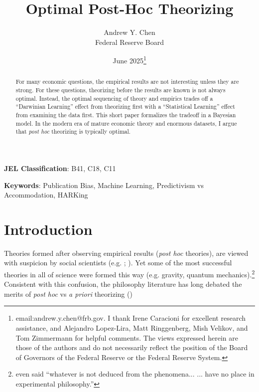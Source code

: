 \documentclass[12pt,english]{article}
\theoremstyle{plain}
\theoremstyle{plain}
\begin{document}
\title{Optimal Post-Hoc Theorizing}

\newif\ifanon
\anontrue
\anonfalse %

\ifanon
    \author{}
    \date{}
\else
    \author{{Andrew Y. Chen}\\
    {\normalsize Federal Reserve Board}}
    \date{June 2025\thanks{email:andrew.y.chen@frb.gov. I thank Irene Caracioni for excellent research assistance, and Alejandro Lopez-Lira, Matt Ringgenberg, Mish Velikov, and Tom Zimmermann for helpful comments. The views expressed herein are those of the authors and do not necessarily reflect the position of the Board of Governors of the Federal Reserve or the Federal Reserve System.}}
\fi

\maketitle

 
\begin{abstract}
\begin{singlespace}
\noindent For many economic questions, the empirical results are not interesting unless they are strong. For these questions, theorizing before the results are known is not always optimal. Instead, the optimal sequencing of theory and empirics trades off a ``Darwinian Learning'' effect from theorizing first with a ``Statistical Learning'' effect from examining the data first. This short paper formalizes the tradeoff in a Bayesian model. In the modern era of mature economic theory and enormous datasets, I argue that \emph{post hoc} theorizing is typically optimal.
\end{singlespace}
\end{abstract}
\vspace{10ex}
\textbf{\color{Black}JEL Classification}: B41, C18, C11

\noindent\textbf{\color{Black}Keywords}: Publication Bias, Machine Learning,  Predictivism vs Accommodation, HARKing
\thispagestyle{empty}\setcounter{page}{0}

\vspace{10ex}

\pagebreak{}

\section{Introduction}

\setcounter{page}{1}

Theories formed after observing empirical results (\emph{post hoc} theories), are viewed with suspicion by social scientists (e.g. \citet{kerr1998harking}; \citet{harvey2017presidential}). Yet some of the most successful theories in all of science were formed this way (e.g. gravity, quantum mechanics).\footnote{\citet{newton1726scholium} even said ``whatever is not deduced from the phenomena... ... have no place in experimental philosophy.''} Consistent with this confusion, the philosophy literature has long debated the merits of \emph{post hoc} vs \emph{a priori} theorizing (\citet{barnes2022prediction})
\end{document}
